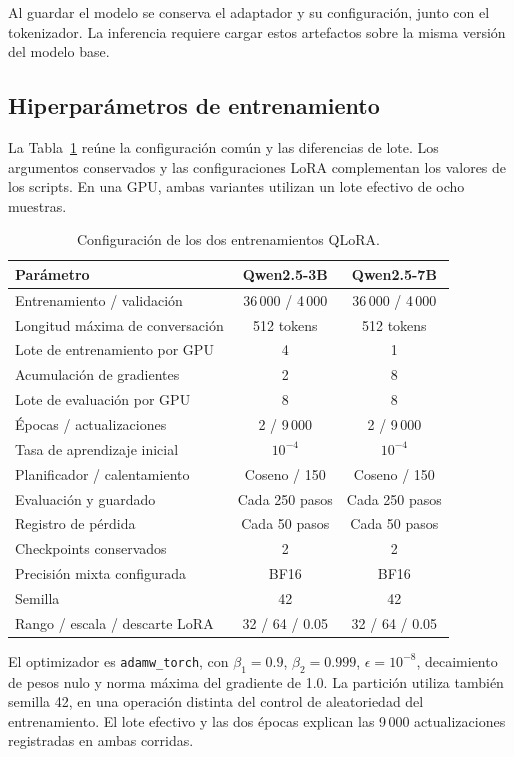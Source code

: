Al guardar el modelo se conserva el adaptador y su configuración,
junto con el tokenizador. La inferencia requiere cargar estos artefactos
sobre la misma versión del modelo base.

\subsection{Hiperparámetros de entrenamiento}

La Tabla~\ref{tab:hiperparametros_qwen} reúne la configuración común
y las diferencias de lote. Los argumentos conservados y las configuraciones
LoRA complementan los valores de los scripts. En una GPU, ambas variantes
utilizan un lote efectivo de ocho muestras.

\begin{table}[htbp]
\centering
\small
\caption{Configuración de los dos entrenamientos QLoRA.}
\label{tab:hiperparametros_qwen}
\begin{tabularx}{\textwidth}{@{}Xcc@{}}
\toprule
\textbf{Parámetro} & \textbf{Qwen2.5-3B} & \textbf{Qwen2.5-7B} \\
\midrule
Entrenamiento / validación & 36\,000 / 4\,000 & 36\,000 / 4\,000 \\
Longitud máxima de conversación & 512 tokens & 512 tokens \\
Lote de entrenamiento por GPU & 4 & 1 \\
Acumulación de gradientes & 2 & 8 \\
Lote de evaluación por GPU & 8 & 8 \\
Épocas / actualizaciones & 2 / 9\,000 & 2 / 9\,000 \\
Tasa de aprendizaje inicial & \(10^{-4}\) & \(10^{-4}\) \\
Planificador / calentamiento & Coseno / 150 & Coseno / 150 \\
Evaluación y guardado & Cada 250 pasos & Cada 250 pasos \\
Registro de pérdida & Cada 50 pasos & Cada 50 pasos \\
Checkpoints conservados & 2 & 2 \\
Precisión mixta configurada & BF16 & BF16 \\
Semilla & 42 & 42 \\
Rango / escala / descarte LoRA & 32 / 64 / 0.05 & 32 / 64 / 0.05 \\
\bottomrule
\end{tabularx}
\end{table}

El optimizador es \texttt{adamw\_torch}, con
\(\beta_1=0.9\), \(\beta_2=0.999\), \(\epsilon=10^{-8}\),
decaimiento de pesos nulo y norma máxima del gradiente de 1.0.
La partición utiliza también semilla 42, en una operación distinta del
control de aleatoriedad del entrenamiento. El lote efectivo y las dos
épocas explican las 9\,000 actualizaciones registradas en ambas corridas.

